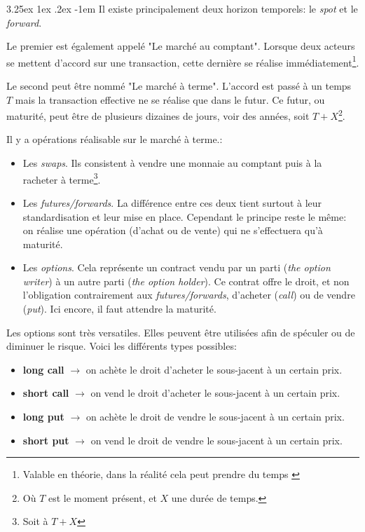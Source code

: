 \documentclass[a4paper, 11pt]{article}
\makeatletter
\renewcommand\paragraph{\@startsection{paragraph}{5}{\z@}%
  {3.25ex \@plus1ex \@minus.2ex}%
  {-1em}%
  {\normalfont\normalsize\bfseries}}
\makeatother
\begin{document}
\paragraph{}
Il existe principalement deux horizon temporels: le \textit{spot} et le \textit{forward}.

Le premier est également appelé "Le marché au comptant". Lorsque deux acteurs se mettent d'accord sur une transaction, cette dernière se réalise immédiatement\footnote{Valable en théorie, dans la réalité cela peut prendre du temps \cite{marche_des_changes}}.

Le second peut être nommé "Le marché à terme". L'accord est passé à un temps $T$ mais la transaction effective ne se réalise que dans le futur. Ce futur, ou maturité, peut être de plusieurs dizaines de jours, voir des années, soit $T + X$\footnote{Où $T$ est le moment présent, et $X$ une durée de temps.}.

Il y a opérations réalisable sur le marché à terme.:
\begin{itemize}
\item Les \textit{swaps}. Ils consistent à vendre une monnaie au comptant puis à la racheter à terme\footnote{Soit à $T+X$}.
\item Les \textit{futures/forwards}. La différence entre ces deux tient surtout à leur standardisation et leur mise en place. Cependant le principe reste le même: on réalise une opération (d'achat ou de vente) qui ne s'effectuera qu'à maturité.
\item Les \textit{options}. Cela représente un contract vendu par un parti (\textit{the option writer}) à un autre parti (\textit{the option holder}). Ce contrat offre le droit, et non l'obligation contrairement aux \textit{futures/forwards}, d'acheter (\textit{call}) ou de vendre (\textit{put}). Ici encore, il faut attendre la maturité.
\end{itemize}

Les options sont très versatiles. Elles peuvent être utilisées afin de spéculer ou de diminuer le risque. Voici les différents types possibles:
\begin{itemize}
\item \textbf{long call} $\rightarrow$ on achète le droit d'acheter le sous-jacent à un certain prix.
\item \textbf{short call} $\rightarrow$ on vend le droit d'acheter le sous-jacent à un certain prix.
\item \textbf{long put} $\rightarrow$ on achète le droit de vendre le sous-jacent à un certain prix.
\item \textbf{short put} $\rightarrow$ on vend le droit de vendre le sous-jacent à un certain prix.
\end{itemize}
\end{document}
